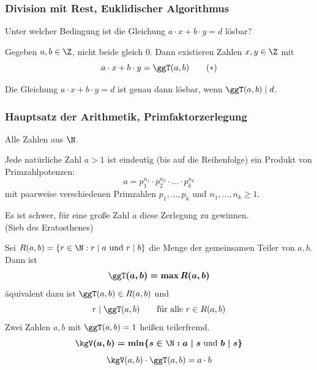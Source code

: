 \subsubsection*{Division mit Rest, Euklidischer Algorithmus}


Unter welcher Bedingung ist die Gleichung $a \cdot x + b \cdot y = d$ lösbar?

\begin{lemma}
Gegeben $a, b \in \Z$, nicht beide gleich $0$. Dann existieren Zahlen $x, y \in \Z$ mit
\[ a \cdot x + b \cdot y = \ggT(a, b) \qquad (*) \]
\end{lemma}

\begin{korollar}[Folgerung]
Die Gleichung $a \cdot x + b \cdot y = d$ ist genau dann lösbar, wenn $\ggT(a, b) \mid d$.
\end{korollar}

\subsubsection*{Hauptsatz der Arithmetik, Primfaktorzerlegung}

Alle Zahlen aus $\N$.

\begin{satz}
Jede natürliche Zahl $a > 1$ ist eindeutig (bis auf die Reihenfolge) ein Produkt von Primzahlpotenzen:
\[ a = p_1^{n_1} \cdot p_2^{n_2} \cdot \ldots \cdot p_k^{n_k} \]
mit paarweise verschiedenen Primzahlen $p_1, \ldots, p_k$ und $n_1, \ldots, n_k \geq 1$.
\end{satz}

Es ist schwer, für eine große Zahl $a$ diese Zerlegung zu gewinnen.\\
(Sieb des Eratosthenes)

\begin{definition}[ggT, kgV]
Sei $R(a, b) = \{ r \in \N : r \mid a \text{ und } r \mid b \}$ die Menge der gemeinsamen Teiler von $a, b$. Dann ist
\[ \boldsymbol{\ggT(a, b) = \max R(a, b)} \]
äquivalent dazu ist $\ggT(a, b) \in R(a, b)$ und
\[ r \mid \ggT(a, b) \qquad \text{für alle } r \in R(a, b) \]
Zwei Zahlen $a, b$ mit $\ggT(a, b) = 1$ heißen teilerfremd.
\[ \boldsymbol{\kgV(a, b) = \min \{ s \in \N : a \mid s \text{ und } b \mid s \}} \]
\[ \kgV(a, b) \cdot \ggT(a, b) = a \cdot b \]
\end{definition}

